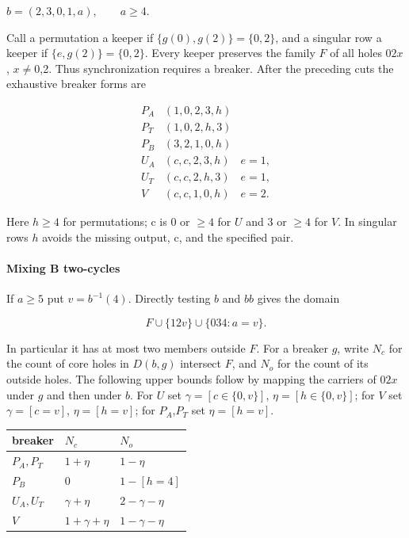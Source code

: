 \documentclass[11pt]{article}
\theoremstyle{definition}
\theoremstyle{plain}
\begin{document}
\(b=(2,3,0,1,a),\qquad a\ge4.\)

Call a permutation a keeper if \(\{g(0),g(2)\}=\{0,2\}\), and a
singular row a keeper if \(\{e,g(2)\}=\{0,2\}\). Every keeper
preserves the family \(F\) of all holes \(02x\), \(x\ne 0\),2. Thus
synchronization requires a breaker. After the preceding cuts the
exhaustive breaker forms are

\[
\begin{array}{ccl}P_A&(1,0,2,3,h)&\\P_T&(1,0,2,h,3)&\\P_B&(3,2,1,0,h)&\\U_A&(c,c,2,3,h)&e=1,\\U_T&(c,c,2,h,3)&e=1,\\V&(c,c,1,0,h)&e=2.\end{array}
\]

Here \(h\ge 4\) for permutations; c is 0 or \(\ge4\) for \(U\) and
3 or \(\ge4\) for \(V\). In singular rows \(h\) avoids the missing
output, c, and the specified pair.

\paragraph{Mixing B two-cycles}\label{mixing-b-two-cycles}

If \(a\ge 5\) put \(v=b^{-1}(4)\). Directly testing \(b\) and \(bb\) gives
the domain

\[
F\cup\{12v\}\cup\{034:a=v\}.
\]

In particular it has at most two members outside \(F\). For a
breaker \(g\), write \(N_c\) for the count of core holes in \(D(b,g)\) intersect
\(F\), and \(N_o\) for the count of its outside holes. The following upper
bounds follow by mapping the carriers of \(02x\) under \(g\) and then
under \(b\). For \(U\) set \(\gamma=[c\in \{0,v\}]\), \(\eta=[h\in \{0,v\}]\); for \(V\) set \(\gamma=[c=v]\),
\(\eta=[h=v]\); for \(P_A\),\(P_T\) set \(\eta=[h=v]\).

\begin{center}
\begin{tabular}{lll}
\toprule
breaker  &  \(N_c\)  &  \(N_o\) \\
\midrule

\(P_A,P_T\) & \(1+\eta\) & \(1-\eta\)\\
\(P_B\) & \(0\) & \(1-[h=4]\)\\
\(U_A,U_T\) & \(\gamma+\eta\) & \(2-\gamma-\eta\)\\
\(V\) & \(1+\gamma+\eta\) & \(1-\gamma-\eta\)\\
\bottomrule
\end{tabular}
\end{center}
\end{document}
